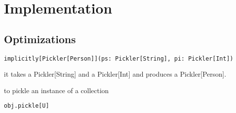 \documentclass[preprint,10pt]{sigplanconf}
\theoremstyle{definition}
\newcommand{\todo}{{\bf \colorbox{red}{\color{white}TODO:}}}
\begin{document}




\section{Implementation}

\subsection{Optimizations}

\begin{verbatim}
implicitly[Pickler[Person]](ps: Pickler[String], pi: Pickler[Int])
\end{verbatim}

it takes a Pickler[String] and a Pickler[Int] and produces a Pickler[Person].

to pickle an instance of a collection

\begin{verbatim}
obj.pickle[U]
\end{verbatim}
\end{document}
